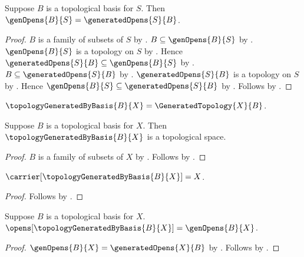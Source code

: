 \begin{theorem}\label{topological_basis_genopens_eq_generated_opens}
    Suppose $B$ is a topological basis for $S$.
    Then $\genOpens{B}{S}=\generatedOpens{S}{B}$.
\end{theorem}
\begin{proof}
    $B$ is a family of subsets of $S$ by .
    $B\subseteq\genOpens{B}{S}$ by .
    $\genOpens{B}{S}$ is a topology on $S$ by
        .
    Hence $\generatedOpens{S}{B}\subseteq\genOpens{B}{S}$ by
        .
    $B\subseteq\generatedOpens{S}{B}$ by
        .
    $\generatedOpens{S}{B}$ is a topology on $S$ by
        .
    Hence $\genOpens{B}{S}\subseteq\generatedOpens{S}{B}$ by
        .
    Follows by .
\end{proof}

\begin{definition}\label{topology_generated_by_basis}
    $\topologyGeneratedByBasis{B}{X}=\GeneratedTopology{X}{B}$.
\end{definition}

\begin{classification}\label{topology_generated_by_basis_is_topological_space}
    Suppose $B$ is a topological basis for $X$.
    Then $\topologyGeneratedByBasis{B}{X}$ is a topological space.
\end{classification}
\begin{proof}
    $B$ is a family of subsets of $X$ by .
    Follows by
        .
\end{proof}

\begin{proposition}\label{topology_generated_by_basis_carrier}
    $\carrier[\topologyGeneratedByBasis{B}{X}]=X$.
\end{proposition}
\begin{proof}
    Follows by
        .
\end{proof}

\begin{proposition}\label{topology_generated_by_basis_opens}
    Suppose $B$ is a topological basis for $X$.
    $\opens[\topologyGeneratedByBasis{B}{X}]=\genOpens{B}{X}$.
\end{proposition}
\begin{proof}
    $\genOpens{B}{X}=\generatedOpens{X}{B}$ by
        .
    Follows by
        .
\end{proof}

